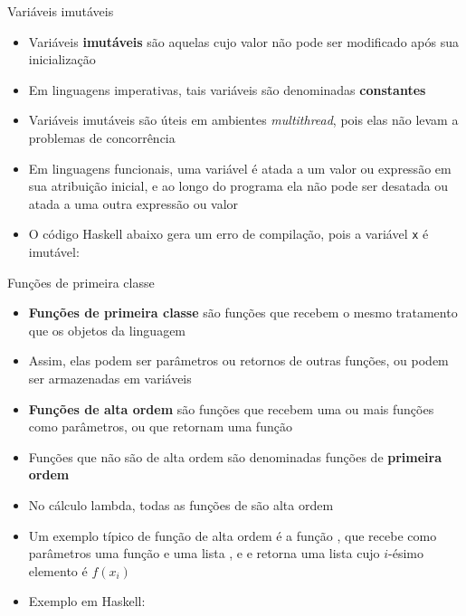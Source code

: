 \begin{frame}[fragile]{Variáveis imutáveis}

    \begin{itemize}
        \item Variáveis \textbf{imutáveis} são aquelas cujo valor não pode ser modificado após sua
            inicialização

        \item Em linguagens imperativas, tais variáveis são denominadas \textbf{constantes}

        \item Variáveis imutáveis são úteis em ambientes \textit{multithread}, pois elas não levam
            a problemas de concorrência

        \item Em linguagens funcionais, uma variável é atada a um valor ou expressão em sua
            atribuição inicial, e ao longo do programa ela não pode ser desatada ou atada a uma
            outra expressão ou valor

        \item O código Haskell abaixo gera um erro de compilação, pois a variável
            \texttt{x} é imutável:

    \end{itemize}
\end{frame}

\begin{frame}[fragile]{Funções de primeira classe}

    \begin{itemize}
        \item \textbf{Funções de primeira classe} são funções que recebem o mesmo tratamento que
            os objetos da linguagem

        \item Assim, elas podem ser parâmetros ou retornos de outras funções, ou podem ser
            armazenadas em variáveis

        \item \textbf{Funções de alta ordem} são funções que recebem uma ou mais funções como
            parâmetros, ou que retornam uma função

        \item Funções que não são de alta ordem são denominadas funções de \textbf{primeira ordem}

        \item No cálculo lambda, todas as funções de são alta ordem

        \item Um exemplo típico de função de alta ordem é a função , que 
            recebe como parâmetros uma função  e uma lista ,
            e e retorna uma lista cujo $i$-ésimo elemento é $f(x_i)$

        \item Exemplo em Haskell:
    \end{itemize}

\end{frame}

